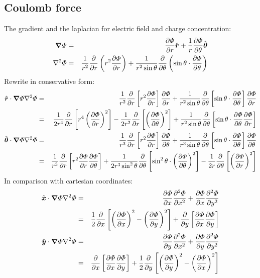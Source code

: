 \subsection{Coulomb force}
The gradient and the laplacian for electric field and charge concentration:
\begin{eqnarray}
  \boldsymbol{\nabla} \varPhi &=& \frac{\partial \varPhi}{\partial r}\hat{\boldsymbol{r}} + \frac{1}{r}\frac{\partial \varPhi}{\partial \theta}\hat{\boldsymbol{\theta}}
  \\
  \nabla^2 \varPhi &=&
  \frac{1}{r^2}\frac{\partial }{\partial r}\left( r^2 \frac{\partial \varPhi}{\partial r} \right) + \frac{1}{r^2 \sin\theta} \frac{\partial }{\partial \theta} \left( \sin\theta \cdot \frac{\partial \varPhi}{\partial \theta}\right)
\end{eqnarray}
Rewrite in conservative form:
\begin{eqnarray}
  \hat{\boldsymbol{r}} \cdot \boldsymbol{\nabla} \varPhi \nabla^2 \varPhi &=&
  \frac{1}{r^2}\frac{\partial }{\partial r}\left[ r^2 \frac{\partial \varPhi}{\partial r} \right] \frac{\partial \varPhi}{\partial r} + \frac{1}{r^2 \sin\theta} \frac{\partial }{\partial \theta} \left[ \sin\theta \cdot \frac{\partial \varPhi}{\partial \theta}\right] \frac{\partial \varPhi}{\partial r}
  \\
  &=&
  \frac{1}{2r^4} \frac{\partial }{\partial r}\left[r^4\left(\frac{\partial \varPhi}{\partial r}\right)^2\right]
  - \frac{1}{2r^2}\frac{\partial }{\partial r}\left[\left(\frac{\partial \varPhi}{\partial \theta}\right)^2\right]
  + \frac{1}{r^2 \sin\theta} \frac{\partial }{\partial \theta}\left[\sin\theta \cdot \frac{\partial \varPhi}{\partial \theta}\frac{\partial \varPhi}{\partial r}\right]
  \\
  \hat{\boldsymbol{\theta}} \cdot \boldsymbol{\nabla} \varPhi \nabla^2 \varPhi &=&
  \frac{1}{r^3}\frac{\partial }{\partial r}\left[ r^2 \frac{\partial \varPhi}{\partial r} \right]\frac{\partial \varPhi}{\partial \theta} + \frac{1}{r^3 \sin\theta} \frac{\partial }{\partial \theta} \left[ \sin\theta \cdot \frac{\partial \varPhi}{\partial \theta}\right]\frac{\partial \varPhi}{\partial \theta}
  \\
  &=&
  \frac{1}{r^3}\frac{\partial }{\partial r}\left[ r^2 \frac{\partial \varPhi}{\partial r} \frac{\partial \varPhi}{\partial \theta}\right]
  + \frac{1}{2r^3 \sin^2\theta} \frac{\partial }{\partial \theta} \left[ \sin^2\theta \cdot \left(\frac{\partial \varPhi}{\partial \theta}\right)^2\right]
  - \frac{1}{2r}\frac{\partial }{\partial \theta}\left[ \left(\frac{\partial \varPhi}{\partial r}\right)^2 \right]
\end{eqnarray}
In comparison with cartesian coordinates:
\begin{eqnarray}
  \hat{\boldsymbol{x}} \cdot \boldsymbol{\nabla} \varPhi \nabla^2 \varPhi &=&
  \frac{\partial \varPhi}{\partial x} \frac{\partial ^2\varPhi}{\partial x^2} + \frac{\partial \varPhi}{\partial x} \frac{\partial ^2\varPhi}{\partial y^2}
  \\ &=& 
  \frac{1}{2}\frac{\partial }{\partial x}\left[\left(\frac{\partial \varPhi}{\partial x}\right)^2 - \left(\frac{\partial \varPhi}{\partial y}\right)^2\right]
  + \frac{\partial }{\partial y}\left[\frac{\partial \varPhi}{\partial x}\frac{\partial \varPhi}{\partial y}\right]
  \\
  \hat{\boldsymbol{y}} \cdot \boldsymbol{\nabla} \varPhi \nabla^2 \varPhi &=&
  \frac{\partial \varPhi}{\partial y} \frac{\partial ^2\varPhi}{\partial x^2} + \frac{\partial \varPhi}{\partial y} \frac{\partial ^2\varPhi}{\partial y^2}
  \\ &=&
  \frac{\partial }{\partial x}\left[\frac{\partial \varPhi}{\partial x}\frac{\partial \varPhi}{\partial y}\right]  
  + \frac{1}{2}\frac{\partial }{\partial y}\left[\left(\frac{\partial \varPhi}{\partial y}\right)^2 - \left(\frac{\partial \varPhi}{\partial x}\right)^2\right]
\end{eqnarray}
